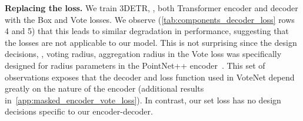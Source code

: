 \documentclass[10pt,twocolumn,letterpaper]{article}
\newcommand{\OURS}{3DETR\xspace}
\newcommand{\rownumber}[1]{\textcolor{Cerulean}{#1}}
\begin{document}
\vspace{0.02in}
\par \noindent \textbf{Replacing the loss.}
We train \OURS, \ie, both Transformer encoder and decoder with the Box and Vote losses.
We observe (\cref{tab:components_decoder_loss} rows \rownumber{4} and \rownumber{5}) that this leads to similar degradation in performance, suggesting that the losses are not applicable to our model.
This is not surprising since the design decisions, \eg, voting radius, aggregation radius \etc in the Vote loss was specifically designed for radius parameters in the PointNet++ encoder~\cite{qi2017pointnet++}.
This set of observations exposes that the decoder and loss function used in VoteNet depend greatly on the nature of the encoder (additional results in~\cref{app:masked_encoder_vote_loss}).
In contrast, our set loss has no design decisions specific to our encoder-decoder.
\end{document}
